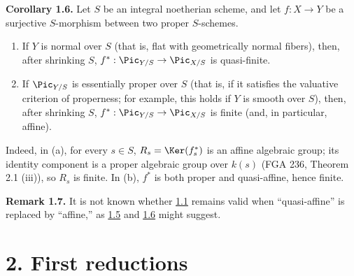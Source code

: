 \textbf{Corollary 1.6.} Let $S$ be an integral noetherian scheme, and let
$f:X\to Y$ be a surjective $S$-morphism between two proper $S$-schemes.
\begin{enumerate}[label=\alph*)]
\item If $Y$ is normal over $S$ (that is, flat with geometrically normal
  fibers), then, after shrinking $S$,
  $f^*:\Pic_{Y/S}\to\Pic_{X/S}$ is quasi-finite.
\item If $\Pic_{Y/S}$ is essentially proper over $S$ (that is, if it
  satisfies the valuative criterion of properness; for example, this holds
  if $Y$ is smooth over $S$), then, after shrinking $S$,
  $f^*:\Pic_{Y/S}\to\Pic_{X/S}$ is finite (and, in particular, affine).
\end{enumerate}
Indeed, in (a), for every $s\in S$, $R_s=\Ker(f_s^*)$ is an affine algebraic
group; its identity component is a proper algebraic group over $k(s)$
(FGA 236, Theorem 2.1 (iii)), so $R_s$ is finite. In (b), $f^*$ is both
proper and quasi-affine, hence finite.

\textbf{Remark 1.7.} It is not known whether \hyperlink{sga6.e12.thm.1-1}{1.1} remains valid when
``quasi-affine'' is replaced by ``affine,'' as \hyperlink{sga6.e12.cor.1-5}{1.5} and \hyperlink{sga6.e12.cor.1-6}{1.6} might suggest.

\section*{2. First reductions}

